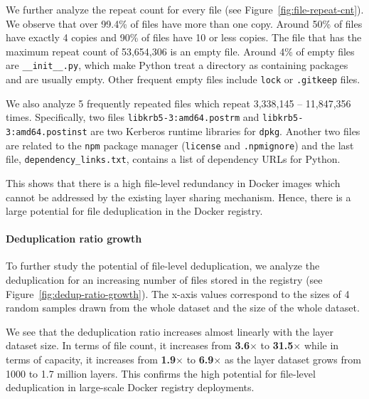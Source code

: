We further analyze the repeat count for every file (see Figure~\ref{fig:file-repeat-cnt}).
%
%
We observe that over 99.4\% of files have more than one copy.
%
Around 50\% of files have exactly 4 copies and 90\% of files have 10 or less
copies. 
%
The file that has the maximum repeat count of 53,654,306 is an empty file.
%
Around 4\% of empty files are \texttt{\_\_init\_\_.py}, which make Python treat a
directory as containing packages and are usually empty.
Other frequent empty files include
\texttt{lock} or \texttt{.gitkeep} files.

We also analyze 5 frequently repeated files which repeat 3,338,145 -- 11,847,356 times.
Specifically, two files 
\texttt{libkrb5-3:amd64.postrm} and \texttt{libkrb5-3:amd64.postinst}
are two Ker\-ber\-os runtime libraries for \texttt{dpkg}.
Another two files are related to the \texttt{npm} package manager (\texttt{license} and \texttt{.npmignore})
and the last file, \texttt{dependency\_links.txt}, contains a list of dependency URLs for Python.

This shows that there is a high file-level redundancy in Docker images
which cannot be addressed by the existing layer sharing mechanism. Hence,
there is a large potential for file deduplication in the Docker registry.

\paragraph{Deduplication ratio growth}


To further study the potential of file-level deduplication, we analyze the deduplication
for an increasing number of files stored in the registry (see Figure~\ref{fig:dedup-ratio-growth}).
%
%
The x-axis values correspond to the sizes of 4 random samples drawn from the whole dataset and the size of the
whole dataset.

We see that the deduplication ratio increases almost linearly with the layer dataset size.
%
In terms of file count, it increases from \textbf{3.6$\times$} to \textbf{31.5$\times$} while
in terms of capacity, it increases from \textbf{1.9$\times$} to
\textbf{6.9$\times$} as the layer dataset grows from 1000 to 1.7 million layers.
%
This confirms the high potential for file-level deduplication in large-scale
Docker registry deployments.
%
